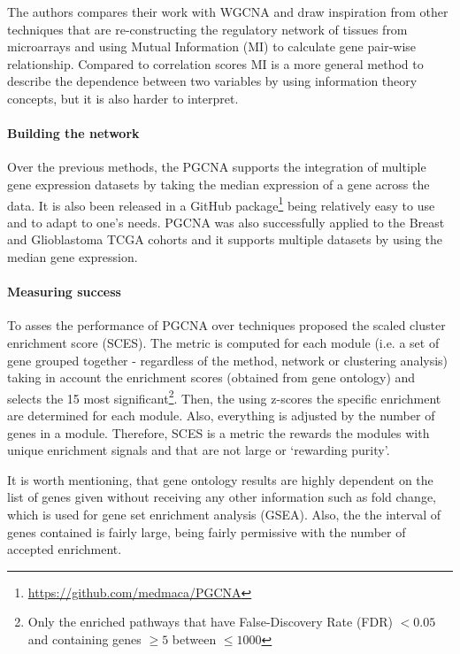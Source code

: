 The authors compares their work with WGCNA and draw inspiration from other techniques that are re-constructing the regulatory network of tissues from microarrays and using Mutual Information (MI) \citet{Margolin2006-mc,Zhang2013-fs} to calculate gene pair-wise relationship. Compared to correlation scores MI is a more general method to describe the dependence between two variables by using information theory concepts, but it is also harder to interpret.

\paragraph*{Building the network} 

Over the previous methods, the PGCNA supports the integration of multiple gene expression datasets by taking the median expression of a gene across the data. It is also been released in a GitHub package\footnote{\url{https://github.com/medmaca/PGCNA} } being relatively easy to use and to adapt to one's needs. PGCNA was also successfully applied to the Breast and Glioblastoma TCGA cohorts and it supports multiple datasets by using the median gene expression.

\paragraph*{Measuring success} 

To asses the performance of PGCNA over techniques \citet{Care2019-ij} proposed the scaled cluster enrichment score (SCES). The metric is computed for each module (i.e. a set of gene grouped together - regardless of the method, network or clustering analysis) taking in account the enrichment scores (obtained from gene ontology) and selects the 15 most significant\footnote{Only the enriched pathways that have False-Discovery Rate (FDR) $<0.05$ and containing genes $\geq5$ between $\leq1000$}. Then, the using z-scores the specific enrichment are determined for each module. Also, everything is adjusted by the number of genes in a module. Therefore, SCES is a metric the rewards the modules with unique enrichment signals and that are not large or ‘rewarding purity'\cite{Care2019-ij}.

It is worth mentioning, that gene ontology results are highly dependent on the list of genes given without receiving any other information such as fold change, which is used for gene set enrichment analysis (GSEA). Also, the the interval of genes contained is fairly large, being fairly permissive with the number of accepted enrichment.

